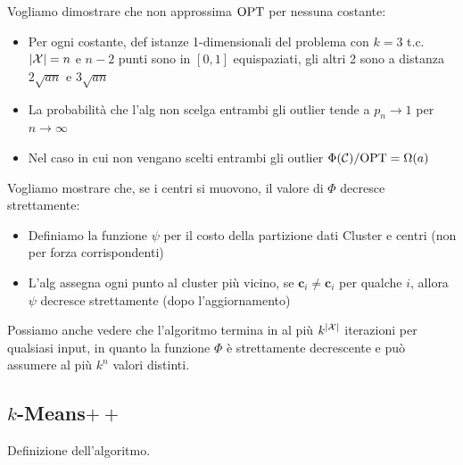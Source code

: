 Vogliamo dimostrare che non approssima $\textnormal{OPT}$ per nessuna costante:
\begin{itemize}
	\item Per ogni costante, def istanze 1-dimensionali del problema con $k = 3$ t.c. $|\mathcal{X}| = n$ e $n-2$ punti sono in $[0,1]$ equispaziati, gli altri 2 sono a distanza $2 \sqrt{an}$ e $3 \sqrt{an}$
	
	\item La probabilità che l'alg non scelga entrambi gli outlier tende a $p_n \rightarrow 1$ per $n \rightarrow \infty$
	
	\item Nel caso in cui non vengano scelti entrambi gli outlier $\Phi (\mathcal{C})/\textnormal{OPT} = \Omega (a)$
\end{itemize}

Vogliamo mostrare che, se i centri si muovono, il valore di $\Phi$ decresce strettamente:
\begin{itemize}
	\item Definiamo la funzione $\psi$ per il costo della partizione dati Cluster e centri (non per forza corrispondenti)
	
	\item L'alg assegna ogni punto al cluster più vicino, se $\bm c_i \neq \bm c_i$ per qualche $i$, allora $\psi$ decresce strettamente (dopo l'aggiornamento)
\end{itemize}

Possiamo anche vedere che l'algoritmo termina in al più $k^{|\mathcal{X}|}$ iterazioni per qualsiasi input, in quanto la funzione $\Phi$ è strettamente decrescente e può assumere al più $k^n$ valori distinti.

\subsection{$k$-Means$++$}

Definizione dell'algoritmo.

